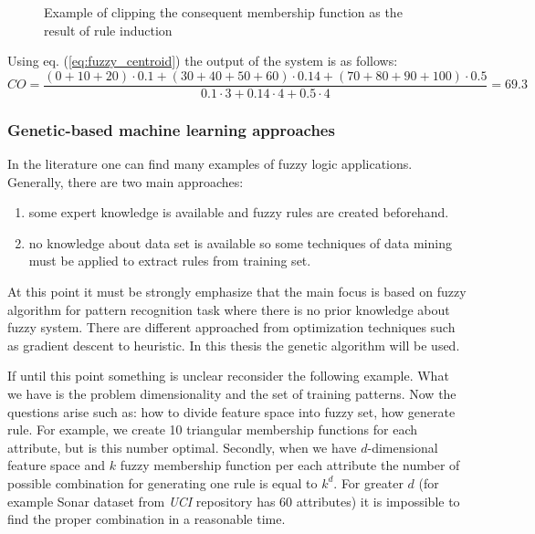 \begin{enumerate}
\begin{figure}[H]
\begin{center}
            \end{center}
            \caption{Example of clipping the consequent membership function
            as the result of rule induction}
            \label{fig:fuzzy_centroid}
        \end{figure}
        Using eq. (\ref{eq:fuzzy_centroid}) the output of the system is as follows:
        $$
        CO = \frac{(0+10+20)\cdot 0.1 + (30+40+50+60)\cdot 0.14 + (70 + 80 + 90
        + 100)\cdot 0.5}{0.1\cdot 3 + 0.14\cdot 4 + 0.5\cdot 4 } = 69.3
        $$

\end{enumerate}
\subsubsection{Genetic-based machine learning approaches}
In the literature one can find many examples of fuzzy logic applications.
Generally, there are two main approaches:
\begin{enumerate}
    \item some expert knowledge is available and fuzzy rules are created
        beforehand.
    \item no knowledge about data set is available so some techniques of data
        mining must be applied to extract rules from training set.
\end{enumerate}
At this point it must be strongly emphasize that the main focus is based on
fuzzy algorithm for pattern recognition task where there is no prior knowledge 
about fuzzy system. There are different approached from optimization techniques
such as gradient descent to heuristic. In this thesis the genetic algorithm
will be used. 

If until this point something is unclear reconsider the following example. What
we have is the problem dimensionality and the set of training patterns. Now the
questions arise such as: how to divide feature space into fuzzy set, how
generate rule. For example, we create 10 triangular membership functions for each
attribute, but is this number optimal. Secondly, when we have $d$-dimensional
feature space and $k$ fuzzy membership function per each attribute
the number of possible combination for generating one rule is equal to $k^d$.
For greater $d$ (for example Sonar dataset from \textit{UCI} repository has 60
attributes) it is impossible to find the proper combination in a reasonable
time.

